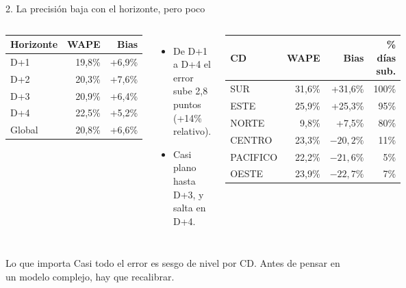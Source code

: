 \documentclass[aspectratio=169,10pt]{beamer}
\begin{document}
\begin{frame}{2. La precisión baja con el horizonte, pero poco}
\begin{columns}[T]
\begin{center}
\begin{tabular}{lrr}
\toprule
Horizonte & WAPE & Bias \\
\midrule
D+1 & 19,8\% & +6,9\% \\
D+2 & 20,3\% & +7,6\% \\
D+3 & 20,9\% & +6,4\% \\
D+4 & 22,5\% & +5,2\% \\
\midrule
Global & 20,8\% & +6,6\% \\
\bottomrule
\end{tabular}
\end{center}
\vspace{0.5em}
\begin{itemize}
\item De D+1 a D+4 el error sube 2,8 puntos (+14\% relativo).
\item Casi plano hasta D+3, y salta en D+4.
\end{itemize}
\begin{center}
\begin{tabular}{lrrr}
\toprule
CD & WAPE & Bias & \% días sub. \\
\midrule
SUR & 31,6\% & +31,6\% & 100\% \\
ESTE & 25,9\% & +25,3\% & 95\% \\
NORTE & 9,8\% & +7,5\% & 80\% \\
CENTRO & 23,3\% & $-20,2\%$ & 11\% \\
PACIFICO & 22,2\% & $-21,6\%$ & 5\% \\
OESTE & 23,9\% & $-22,7\%$ & 7\% \\
\bottomrule
\end{tabular}
\end{center}
\end{columns}
\vspace{0.8em}
\begin{block}{Lo que importa}
Casi todo el error es sesgo de nivel por CD. Antes de pensar en un modelo complejo, hay que recalibrar.
\end{block}
\end{frame}
\end{document}
